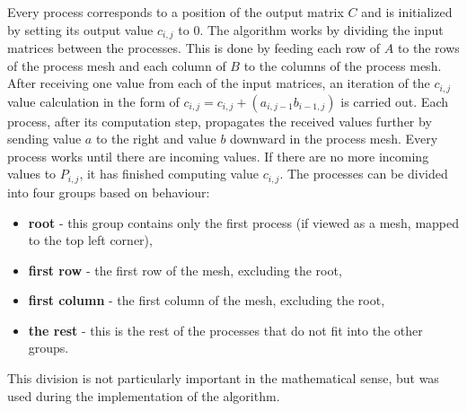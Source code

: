 \documentclass[pdftex, 11pt, a4paper, titlepage]{article}
\begin{document}
    Every process corresponds to a position of the output matrix $C$ and is initialized
    by setting its output value $c_{i,j}$ to $0$.
    The algorithm works by dividing the input matrices between the processes. This is
    done by feeding each row of $A$ to the rows of the process mesh and
    each column of $B$ to the columns of the process mesh. After receiving one value
    from each of the input matrices, an iteration of the $c_{i,j}$ value calculation
    in the form of $c_{i,j} = c_{i,j} + (a_{i,j-1} b_{i-1,j})$ is carried out.
    Each process, after its computation step, propagates the received values further
    by sending value $a$ to the right and value $b$ downward in the process mesh.
    Every process works until there are incoming values. If there are no more incoming
    values to $P_{i,j}$, it has finished computing value $c_{i,j}$.
    The processes can be divided into four groups based on behaviour:
    \begin{itemize}
        \item \textbf{root} - this group contains only the first process (if viewed as a mesh,
                mapped to the top left corner),
        \item \textbf{first row} - the first row of the mesh, excluding the root,
        \item \textbf{first column} - the first column of the mesh, excluding the root,
        \item \textbf{the rest} - this is the rest of the processes that do not fit into the
                other groups.
    \end{itemize}
    This division is not particularly important in the mathematical sense, but was
    used during the implementation of the algorithm.
\end{document}
